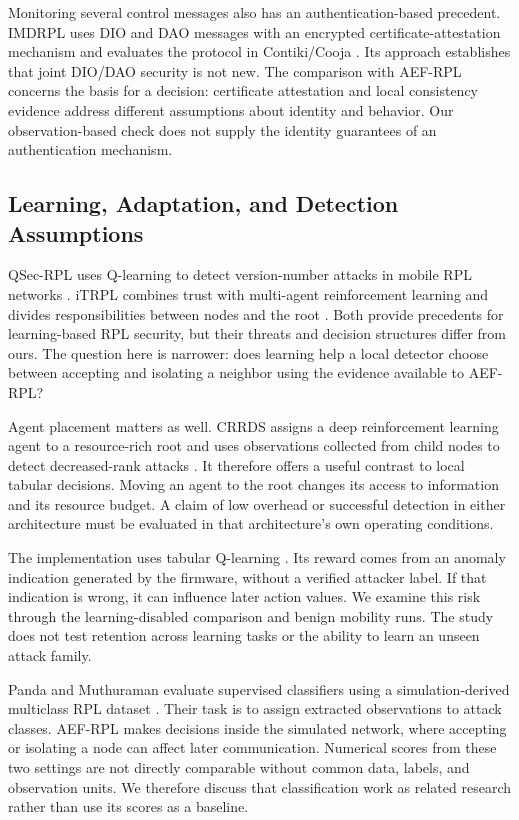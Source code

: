\documentclass[journal]{IEEEtran}
\begin{document}
Monitoring several control messages also has an authentication-based precedent. IMDRPL uses DIO and DAO messages with an encrypted certificate-attestation mechanism and evaluates the protocol in Contiki/Cooja \cite{imdrpl2023}. Its approach establishes that joint DIO/DAO security is not new. The comparison with AEF-RPL concerns the basis for a decision: certificate attestation and local consistency evidence address different assumptions about identity and behavior. Our observation-based check does not supply the identity guarantees of an authentication mechanism.

\subsection{Learning, Adaptation, and Detection Assumptions}
QSec-RPL uses Q-learning to detect version-number attacks in mobile RPL networks \cite{qsecrpl2023}. iTRPL combines trust with multi-agent reinforcement learning and divides responsibilities between nodes and the root \cite{itrpl2024}. Both provide precedents for learning-based RPL security, but their threats and decision structures differ from ours. The question here is narrower: does learning help a local detector choose between accepting and isolating a neighbor using the evidence available to AEF-RPL?

Agent placement matters as well. CRRDS assigns a deep reinforcement learning agent to a resource-rich root and uses observations collected from child nodes to detect decreased-rank attacks \cite{haqdad2026}. It therefore offers a useful contrast to local tabular decisions. Moving an agent to the root changes its access to information and its resource budget. A claim of low overhead or successful detection in either architecture must be evaluated in that architecture's own operating conditions.

The implementation uses tabular Q-learning \cite{watkins1992}. Its reward comes from an anomaly indication generated by the firmware, without a verified attacker label. If that indication is wrong, it can influence later action values. We examine this risk through the learning-disabled comparison and benign mobility runs. The study does not test retention across learning tasks or the ability to learn an unseen attack family.

Panda and Muthuraman evaluate supervised classifiers using a simulation-derived multiclass RPL dataset \cite{panda2026}. Their task is to assign extracted observations to attack classes. AEF-RPL makes decisions inside the simulated network, where accepting or isolating a node can affect later communication. Numerical scores from these two settings are not directly comparable without common data, labels, and observation units. We therefore discuss that classification work as related research rather than use its scores as a baseline.
\end{document}
